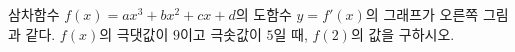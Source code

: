 \noindent\begin{minipage}[t]{0.58\linewidth}\vspace{0pt}\raggedright 삼차함수 $f(x)=ax^3+bx^2+cx+d$의 도함수 $y=f'(x)$의 그래프가 오른쪽 그림과 같다. $f(x)$의 극댓값이 $9$이고 극솟값이 $5$일 때, $f(2)$의 값을 구하시오. \end{minipage}\hfill\begin{minipage}[t]{0.4\linewidth}\vspace{0pt}\centering \resizebox{\ifdim\width>\linewidth\linewidth\else\width\fi}{!}{}\end{minipage}\par
